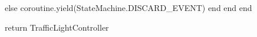 \begin{appendices}
\begin{listing}[htp]
\begin{luacode}
		else
			coroutine.yield(StateMachine.DISCARD_EVENT)
		end
	end
end

return TrafficLightController
\end{luacode}
\end{listing}

\begin{listing}
\begin{luacode}


\end{luacode}
\end{listing}

\begin{listing}
\begin{luacode}


\end{luacode}
\end{listing}

\end{appendices}